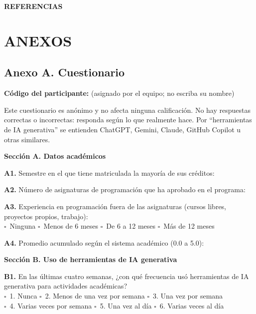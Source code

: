 \documentclass[12pt,letterpaper]{article}
\numberwithin{table}{section}
\numberwithin{figure}{section}
\newcommand{\casilla}{$\square$}
\begin{document}
\newpage
{}
\begin{center}
{\bfseries\MakeUppercase{Referencias}}
\end{center}
\vspace{0.5cm}

\printbibliography[title={},heading=none]

\vspace{0.5cm}

\newpage
{}
\section*{\MakeUppercase{Anexos}}

\subsection*{Anexo A. Cuestionario}

\textbf{Código del participante:} \underline{\hspace{3cm}} (asignado por el equipo; no escriba su nombre)

Este cuestionario es anónimo y no afecta ninguna calificación. No hay respuestas correctas o incorrectas: responda según lo que realmente hace. Por ``herramientas de IA generativa'' se entienden ChatGPT, Gemini, Claude, GitHub Copilot u otras similares.

\textbf{Sección A. Datos académicos}

\textbf{A1.} Semestre en el que tiene matriculada la mayoría de sus créditos: \underline{\hspace{2cm}}

\textbf{A2.} Número de asignaturas de programación que ha aprobado en el programa: \underline{\hspace{2cm}}

\textbf{A3.} Experiencia en programación fuera de las asignaturas (cursos libres, proyectos propios, trabajo):\\
\casilla\ Ninguna \quad \casilla\ Menos de 6 meses \quad \casilla\ De 6 a 12 meses \quad \casilla\ Más de 12 meses

\textbf{A4.} Promedio acumulado según el sistema académico (0.0 a 5.0): \underline{\hspace{2cm}}

\medskip
\textbf{Sección B. Uso de herramientas de IA generativa}

\textbf{B1.} En las últimas cuatro semanas, ¿con qué frecuencia usó herramientas de IA generativa para actividades académicas?\\
\casilla\ 1. Nunca \quad \casilla\ 2. Menos de una vez por semana \quad \casilla\ 3. Una vez por semana\\
\casilla\ 4. Varias veces por semana \quad \casilla\ 5. Una vez al día \quad \casilla\ 6. Varias veces al día
\end{document}
